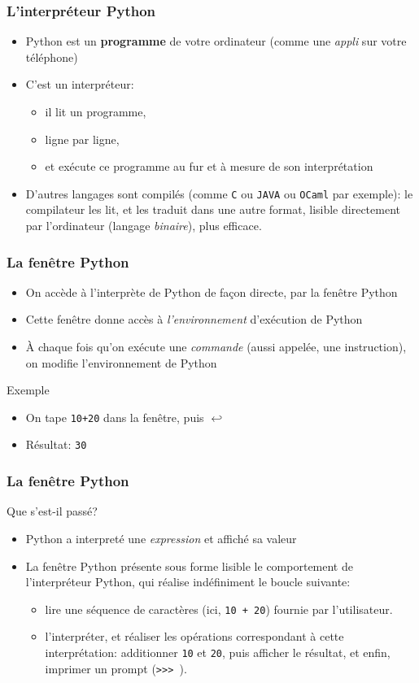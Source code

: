 \documentclass{beamer}
\newcommand{\mypause}{\pause}
\newcommand{\alalign}{{$\hookleftarrow$}}
\newcommand{\pyth}{{\sc Python}}
\newcommand{\prog}[1]{\alert{\texttt{#1}}}
\begin{document}
\frame
{
\frametitle{L'interpréteur \pyth{}}
\begin{itemize}
\item \pyth{} est un \textbf{programme} de votre ordinateur (comme une \emph{appli} sur votre téléphone)\mypause{}
\item C'est un \alert{interpréteur}:
  \begin{itemize}
    \item
    il lit un programme,
    \item
    ligne par ligne,
    \item
    et exécute ce programme au fur et à mesure de son interprétation
  \end{itemize}
  \mypause{}
\item D'autres langages sont \alert{compilés} (comme \texttt{C} ou \texttt{JAVA} ou \texttt{OCaml} par exemple): le \alert{compilateur} les lit, et les traduit dans une autre format, lisible directement par l'ordinateur (langage \emph{binaire}), plus efficace.
\end{itemize}
}


\frame
{
\frametitle{La fenêtre \pyth{}}
\begin{itemize}
\item On accède à l'interprète de \pyth{} de façon directe, par la fenêtre \pyth{}  \mypause{}
\item Cette fenêtre donne accès à {\em l'environnement} d'exécution de
\pyth{}  \mypause{}
\item À chaque fois qu'on exécute une {\em commande} (aussi appelée, une
\alert{instruction}), on modifie \alert{l'environnement} de \pyth{}  \mypause{}
\end{itemize}

\begin{block}{Exemple}
\begin{itemize}
\item On tape \prog{10+20} dans la fenêtre, puis \alalign{}
\item Résultat: \prog{30}
\end{itemize}
\end{block}
}

\frame
{
\frametitle{La fenêtre \pyth{}}
\begin{block}{Que s'est-il passé?}
\begin{itemize}
\item \pyth{} a interpreté une \alert{\em expression} et
affiché sa valeur \mypause{}
\item La fenêtre \pyth{} présente sous forme lisible le comportement
de l'interpréteur \pyth{}, qui réalise indéfiniment le boucle suivante:
  \begin{itemize}
  \item lire une séquence de caractères (ici, \prog{10 + 20}) fournie par
  l'utilisateur.
  \item l'interpréter, et réaliser les opérations correspondant
  à cette interprétation: additionner \prog{10} et \prog{20}, puis afficher
  le résultat, et enfin, imprimer un prompt (\prog{>>> }).
  \end{itemize}
\end{itemize}
\end{block}
}
\end{document}
